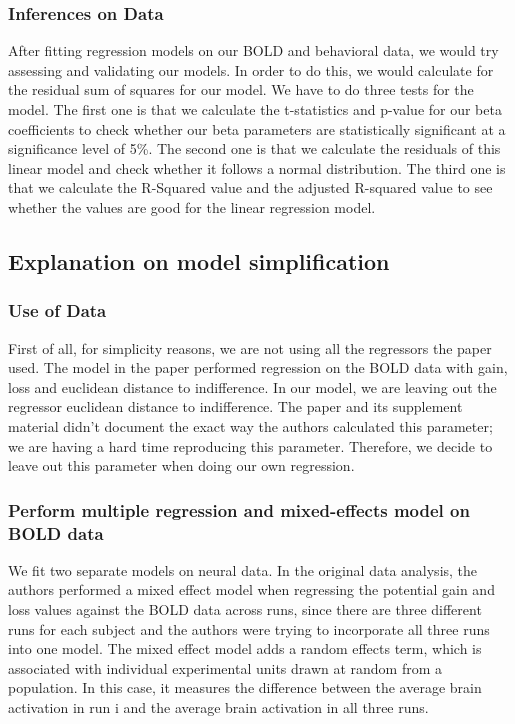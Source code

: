 \subsubsection{Inferences on Data}

After fitting regression models on our BOLD and behavioral data, we would try 
assessing and validating our models. In order to do this, we would calculate 
for the residual sum of squares for our model. We have to do three tests for 
the model. The first one is that we calculate the t-statistics and p-value for 
our beta coefficients to check whether our beta parameters are statistically 
significant at a significance level of 5\%. The second one is that we calculate
the residuals of this linear model and check whether it follows a normal 
distribution. The third one is that we calculate the R-Squared value and the 
adjusted R-squared value to see whether the values are good for the linear 
regression model.\\


\subsection{Explanation on model simplification}

\subsubsection{Use of Data}
\indent \indent First of all, for simplicity reasons, we are not using all the 
regressors the paper used. The model in the paper performed regression on the 
BOLD data with gain, loss and euclidean distance to indifference. In our model,
we are leaving out the regressor euclidean distance to indifference. The paper 
and its supplement material didn't document the exact way the authors 
calculated this parameter; we are having a hard time reproducing this 
parameter. Therefore, we decide to leave out this parameter when doing our own 
regression.

\subsubsection{Perform multiple regression and mixed-effects model on BOLD data}

\indent \indent We fit two separate models on neural data. In the 
original data analysis, the authors performed a mixed effect model when 
regressing the potential gain and loss values against the BOLD data across 
runs, since there are three different runs for each subject and the authors 
were trying to incorporate all three runs into one model. The mixed effect 
model adds a random effects term, which is associated with individual 
experimental units drawn at random from a population. In this case, it 
measures the difference between the average brain activation in run i and the 
average brain activation in all three runs.

